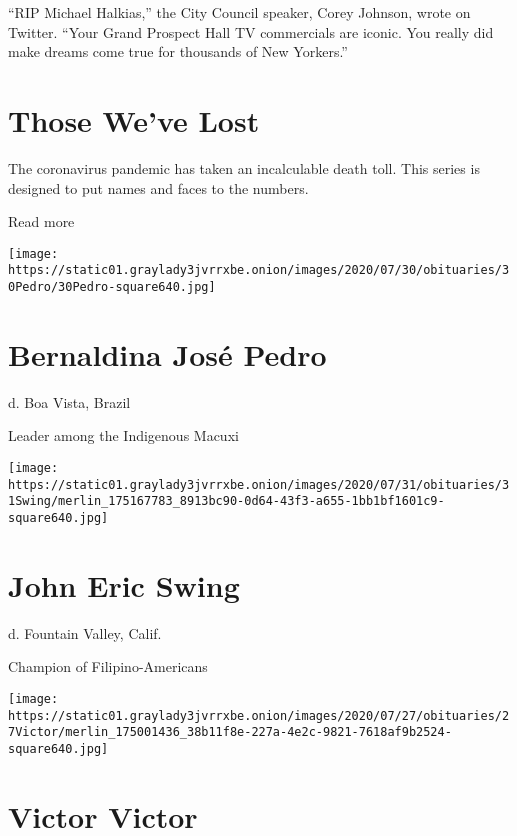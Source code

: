 ``RIP Michael Halkias,'' the City Council speaker, Corey Johnson, wrote
on Twitter. ``Your Grand Prospect Hall TV commercials are iconic. You
really did make dreams come true for thousands of New Yorkers.''

\href{https://www.nytimes3xbfgragh.onion/interactive/2020/obituaries/people-died-coronavirus-obituaries.html?action=click\&pgtype=Article\&state=default\&region=BELOW_MAIN_CONTENT\&context=covid_obits_promo}{}

\hypertarget{those-weve-lost}{%
\section{Those We've Lost}\label{those-weve-lost}}

The coronavirus pandemic has taken an incalculable death toll. This
series is designed to put names and faces to the numbers.

Read more

\texttt{[image: https://static01.graylady3jvrrxbe.onion/images/2020/07/30/obituaries/30Pedro/30Pedro-square640.jpg]}

\hypertarget{bernaldina-josuxe9-pedro}{%
\section{Bernaldina José Pedro}\label{bernaldina-josuxe9-pedro}}

d. Boa Vista, Brazil

Leader among the Indigenous Macuxi

\texttt{[image: https://static01.graylady3jvrrxbe.onion/images/2020/07/31/obituaries/31Swing/merlin\_175167783\_8913bc90-0d64-43f3-a655-1bb1bf1601c9-square640.jpg]}

\hypertarget{john-eric-swing}{%
\section{John Eric Swing}\label{john-eric-swing}}

d. Fountain Valley, Calif.

Champion of Filipino-Americans

\texttt{[image: https://static01.graylady3jvrrxbe.onion/images/2020/07/27/obituaries/27Victor/merlin\_175001436\_38b11f8e-227a-4e2c-9821-7618af9b2524-square640.jpg]}

\hypertarget{victor-victor}{%
\section{Victor Victor}\label{victor-victor}}

